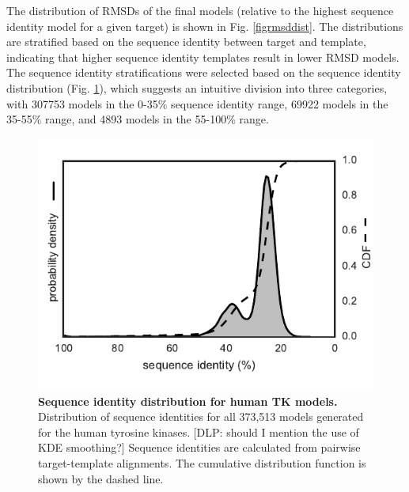 \documentclass[aps,pre,twocolumn,nofootinbib,superscriptaddress,linenumbers]{revtex4-1}
\begin{document}
The distribution of RMSDs of the final models (relative to the highest sequence identity model for a given target) is shown in Fig. \ref{figrmsddist}.
The distributions are stratified based on the sequence identity between target and template, indicating that higher sequence identity templates result in lower RMSD models.
The sequence identity stratifications were selected based on the sequence identity distribution (Fig. \ref{figseqiddist}), which suggests an intuitive division into three categories, with \num{307753} models in the 0-35\% sequence identity range, \num{69922} models in the 35-55\% range, and \num{4893} models in the 55-100\% range. 


\begin{figure}[tb]
  \centering
    \includegraphics[width=1.0\textwidth]{seqid_dist/seqid_dist}
    \caption{{\bf Sequence identity distribution for human TK models.}
    Distribution of sequence identities for all 373,513 models generated for the human tyrosine kinases.
    {\color{blue}[DLP: should I mention the use of KDE smoothing?]}
    Sequence identities are calculated from pairwise target-template alignments.
    The cumulative distribution function is shown by the dashed line.
    }
  \label{figseqiddist}
\end{figure}
\end{document}
